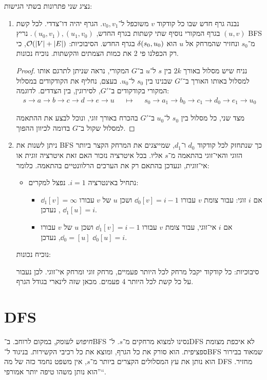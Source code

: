 \documentclass[]{../../../../tex/classes/styledArticle}
\begin{document}
	נציג שני פתרונות בשתי הגישות: 
	\begin{enumerate}
		\item נבנה גרף חדש שבו כל קודקוד $v$ משוכפל ל־$v_0, v_1$. הגרף יהיה דו־צדדי. לכל קשת $(u, v)$ בגרף המקורי נוסיף שתי קשתות בגרף החדש, $(u_0, v_1), (u_1, v_0)$. נריץ BFS מ־$s_0$ ונחזיר שהמרחק אל $u$ הוא $\delta(s_0, u_0)$ בגרף החדש. הסיבוכיות: $\mathcal{O}(\left \lvert V \right \rvert + \left \lvert E \right \rvert)$, כי רק הכפלנו פי 2 את כמות הצמתים והקשתות. נוכיח נכונות. \begin{proof}
			נניח שיש מסלול באורך $2k$ בין $s$ ל־$u$ ב־$G$ המקורי, נראה שניתן לתרגם אותו למסלול באותו האורך ב־$G'$ שבנינו בין $s_0$ ל־$u_0$. בעצם, נחליף את הקודקודים במסלול המקורי בקודקודים ב־$G'$, לסירוגין, בין הצדדים. לדוגמה: 
			\begin{align*}
				s \to a \to b \to c \to d \to e \to u && \mapsto && s_0 \to a_1 \to b_0 \to c_1 \to d_0 \to e_1 \to u_0
			\end{align*}
			
			מצד שני, כל מסלול בין $s_0$ ל־$u_0$ ב־$G'$ בהכרח באורך זוגי, ונוכל לבצע את ההתאמה למסלול שקול ב־$G$ בדומה לכיוון ההפוך. 
		\end{proof}
		\item ניתן לשנות את BFS כך שנתחזק לכל קודקוד $d_0$ ו־$d_1$, שמייצגים את המרחק הקצר ביותר הזוגי והאי־זוגי בהתאמה מ־$s$ אליו. בכל איטרציה נזכור האם זאת איטרציה זוגית או אי־זוגית, ונעדכן בהתאם רק את הערכים הרלוונטיים בהתאמה. 
		כלומר: 
		
		\begin{itemize}
			\item נתחיל באינטרציה $i = 1$. נפצל למקרים: 
			\begin{itemize}
				\item אם $i$ זוגי: עבור צומת $v$ עבורו $\dd_0[v] = i - 1$ ושכן $u$ של $v$ עבורו $\dd_1[v] = \infty$, נעדכן $\dd_1[u] = i$. 
				\item אם $i$ אי־זוגי, עבור צומת $v$ עבורו $\dd_1[v] = i - 1$ ושכן $u$ של $v$ עבורו $\dd_0 = [u]$, נעדכן $\dd_0[u] = i$. 
			\end{itemize}
		\end{itemize}
		נוכיח נכונות: 
		\prooftrivial
		
		סיבוכיות: כל קודקוד יקבל מרחק לכל היותר פעמיים, מרחק זוגי ומרחק אי־זוגי. לכן נעבור על כל קשת לכל היותר 4 פעמים. מכאן שזה לינארי בגודל הגרף. 
	\end{enumerate}
	
	\section*{DFS}
	\textit{חיפוש לעומק}, במקום לרוחב. ב־BFS נסינו למצוא מרחקים מ־$s$. ל־DFS לא איכפת מצומת ספציפית. הוא סורק את כל הגרף, ומוצא את כל רכיבי הקשירות. בניגוד ל־BFS שמאוד בבירור הוא נותן את עץ המסלולים הקצרים ביותר מ־$s$, אין משפט נחמד כזה של מה DFS מחזיר. ''הוא נותן משהו טיפה יותר אמורפי``. 
	
\end{document}

